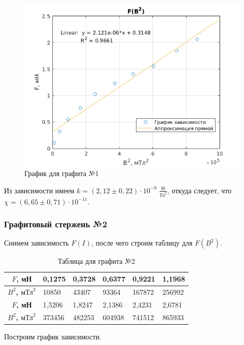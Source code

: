 \begin{figure}[h]
    \centering
    \includegraphics[width = 12 cm]{images/gr.png}
    \caption{График для графита №1}
    \label{gr1}
\end{figure}

Из зависимости имеем $k = (2,12 \pm 0,22) \cdot 10^{-9} \; \frac{\text{Н}}{\text{Тл}^2}$, откуда следует, что $\chi = (6,65 \pm 0,71) \cdot 10^{-11}$. 

\subsubsection{Графитовый стержень №2}

Снимем зависимость $F(I)$, после чего строим таблицу для $F(B^2)$.

\begin{table}[]
    \centering
    \begin{tabular}{|c|l|l|l|l|l|}
    \hline
    \textbf{$F$, мН}               & 0,1275 & 0,3728 & 0,6377 & 0,9221 & 1,1968 \\ \hline
    \textbf{$B^2$, $\text{мТл}^2$} & 10850  & 43407  & 93364  & 167872 & 256992 \\ \hline
    \textbf{$F$, мН}               & 1,5206 & 1,8247 & 2,1386 & 2,4231 & 2,6781 \\ \hline
    \textbf{$B^2$, $\text{мТл}^2$} & 373456 & 482253 & 604938 & 741512 & 865933 \\ \hline
    \end{tabular}
    \caption{Таблица для графита №2}
\end{table}

Построим график зависимости.


